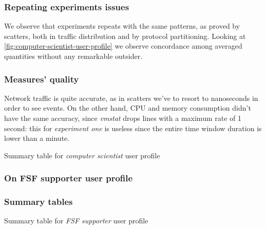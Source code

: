 \documentclass[10pt,a4paper]{article}
\begin{document}
    \subsubsection*{Repeating experiments issues}
    
    We observe that experiments repeats with the same patterns, as
    proved by scatters, both in traffic distribution and by protocol
    partitioning. Looking at \autoref{fig:computer-scientist-user-profile} we
    observe concordance among averaged quantities without any
    remarkable outsider. 


    \subsubsection*{Measures' quality}
    Network traffic is quite accurate, as in scatters we've to resort
    to nanoseconds in order to see events. On the other hand, CPU and
    memory consumption didn't have the same accuracy, since
    \emph{vmstat} drops lines with a maximum rate of 1 second: this
    for \emph{experiment one} is useless since the entire time window
    duration is lower than a minute.
  
    \begin{table}
      \begin{adjustwidth}{-2cm}{}
            
      \end{adjustwidth}
      \caption{Summary table for \emph{computer scientist} user profile}
      \label{fig:computer-scientist-user-profile}
    \end{table}

    
    \subsubsection{On FSF supporter user profile}

    
    \subsubsection{Summary tables}


    \begin{table}
      \begin{adjustwidth}{-2cm}{}
        
      \end{adjustwidth}
      \caption{Summary table for \emph{FSF supporter} user profile}
      \label{fig:FSF-supporter-user-profile}
    \end{table}
\end{document}
